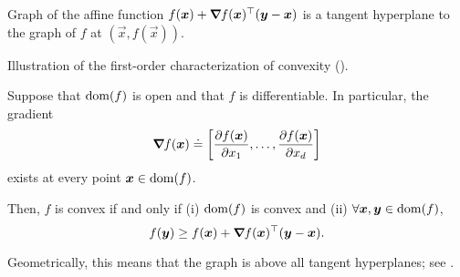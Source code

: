 \begin{marginfigure}[-6cm]
    \centering
    \caption{Graph of the affine function $f(\bm{x}) + \bm{\nabla}_{\! } f(\bm{x})^\top(\bm{y}-\bm{x})$ is a tangent hyperplane to the graph of $f$ at $(\vec{x},f(\vec{x}))$.}
    \label{fig:differentiable-function}
\end{marginfigure}

\begin{marginfigure}
    \centering
    \caption{Illustration of the first-order characterization of convexity ().}
    \label{fig:first-order-convexity}
\end{marginfigure}

\begin{lemma} \label{lem:first-order-convexity}
    Suppose that $\mathrm{dom}(f)$ is open and that $f$ is differentiable. In particular, the gradient \[
        \grad{f(\vec{x})}{} \doteq \lft[ \pdv{f(\vec{x})}{x_1}, \ldots, \pdv{f(\vec{x})}{x_d} \rgt]
    \]
    exists at every point $\bm{x}\in\mathrm{dom}(f)$.

    Then, $f$ is convex if and only if (i) $\mathrm{dom}(f)$ is convex and (ii) $\forall \bm{x}, \bm{y} \in
        \mathrm{dom}(f)$, \[
        f(\bm{y}) \geq f(\bm{x}) + \bm{\nabla}_{\! } f(\bm{x})^\top (\bm{y}-\bm{x}).
    \]
\end{lemma}

Geometrically, this means that the graph is above all tangent hyperplanes; see
.


